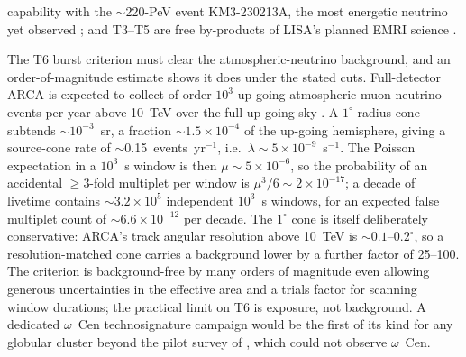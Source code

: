 \documentclass[11pt]{article}
\begin{document}
capability with the $\sim$220-PeV event KM3-230213A, the most energetic neutrino yet observed \citep{KM3NeT2025}; and T3--T5 are free by-products of LISA's planned EMRI science \citep{Colpi2024}.

The T6 burst criterion must clear the atmospheric-neutrino background, and an order-of-magnitude estimate shows it does under the stated cuts. Full-detector ARCA is expected to collect of order $10^{3}$ up-going atmospheric muon-neutrino events per year above 10~TeV over the full up-going sky \citep[effective areas and atmospheric fluxes from the KM3NeT~2.0 letter of intent;][]{AdrianMartinez2016}. A $1^{\circ}$-radius cone subtends $\sim$$10^{-3}$~sr, a fraction $\sim$$1.5\times10^{-4}$ of the up-going hemisphere, giving a source-cone rate of $\sim$0.15~events~yr$^{-1}$, i.e.\ $\lambda \sim 5\times10^{-9}$~s$^{-1}$. The Poisson expectation in a $10^{3}$~s window is then $\mu \sim 5\times10^{-6}$, so the probability of an accidental $\geq$3-fold multiplet per window is $\mu^{3}/6 \sim 2\times10^{-17}$; a decade of livetime contains $\sim$$3.2\times10^{5}$ independent $10^{3}$~s windows, for an expected false multiplet count of $\sim$$6.6\times10^{-12}$ per decade. The $1^{\circ}$ cone is itself deliberately conservative: ARCA's track angular resolution above 10~TeV is $\sim$$0.1$--$0.2^{\circ}$, so a resolution-matched cone carries a background lower by a further factor of 25--100. The criterion is background-free by many orders of magnitude even allowing generous uncertainties in the effective area and a trials factor for scanning window durations; the practical limit on T6 is exposure, not background. A dedicated $\omega$~Cen technosignature campaign would be the first of its kind for any globular cluster beyond the pilot survey of \citet{Huang2026}, which could not observe $\omega$~Cen.
\end{document}
